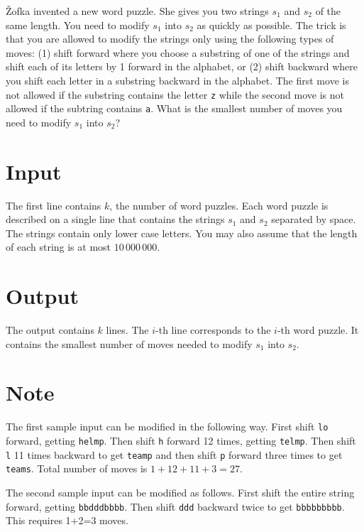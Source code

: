 
\v{Z}ofka invented a new word puzzle. She gives you two strings $s_1$ and $s_2$ of the same length. You need to modify $s_1$ into $s_2$ as quickly as possible. The trick is that you are allowed to modify the strings only using the following types of moves: (1) shift forward where you choose a substring of one of the strings and shift each of its letters by 1 forward in the alphabet, or (2) shift backward where you shift each letter in a substring backward in the alphabet. The first move is not allowed if the substring contains the letter {\tt z} while the second move is not allowed if the subtring contains {\tt a}. What is the smallest number of moves you need to modify $s_1$ into $s_2$?

\section*{Input}
The first line contains $k$, the number of word puzzles.
Each word puzzle is described on a single line that contains the strings $s_1$ and $s_2$ separated
by space. The strings contain only lower case letters. You may also assume that the length of each
string is at most $10\,000\,000$.


\section*{Output}
The output contains $k$ lines. The $i$-th line corresponds to the $i$-th word puzzle.
It contains the smallest number of moves needed to modify $s_1$ into $s_2$.


\section*{Note}
The first sample input can be modified in the following way. First shift {\tt lo} forward, getting
{\tt helmp}. Then shift {\tt h} forward 12 times, getting {\tt telmp}. Then shift {\tt l} 11 times
backward to get {\tt teamp} and then shift {\tt p} forward three times to get {\tt teams}. Total
number of moves is $1+12+11+3=27$.

The second sample input can be modified as follows. First shift the entire string forward, getting {\tt bbdddbbbb}. Then shift {\tt ddd} backward twice to get {\tt bbbbbbbbb}. This requires 1+2=3 moves.
